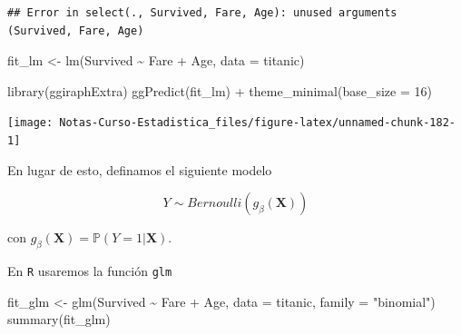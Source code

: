 \documentclass[
  12pt,
]{book}
\newenvironment{Shaded}{\begin{snugshade}}{\end{snugshade}}
\newcommand{\AttributeTok}[1]{\textcolor[rgb]{0.77,0.63,0.00}{#1}}
\newcommand{\DecValTok}[1]{\textcolor[rgb]{0.00,0.00,0.81}{#1}}
\newcommand{\FunctionTok}[1]{\textcolor[rgb]{0.00,0.00,0.00}{#1}}
\newcommand{\NormalTok}[1]{#1}
\newcommand{\OtherTok}[1]{\textcolor[rgb]{0.56,0.35,0.01}{#1}}
\newcommand{\SpecialCharTok}[1]{\textcolor[rgb]{0.00,0.00,0.00}{#1}}
\newcommand{\StringTok}[1]{\textcolor[rgb]{0.31,0.60,0.02}{#1}}
\begin{document}
\begin{verbatim}
## Error in select(., Survived, Fare, Age): unused arguments (Survived, Fare, Age)
\end{verbatim}

\begin{Shaded}
\begin{Highlighting}[]
\NormalTok{fit\_lm }\OtherTok{\textless{}{-}} \FunctionTok{lm}\NormalTok{(Survived }\SpecialCharTok{\textasciitilde{}}\NormalTok{ Fare }\SpecialCharTok{+}\NormalTok{ Age, }\AttributeTok{data =}\NormalTok{ titanic)}
\end{Highlighting}
\end{Shaded}

\begin{Shaded}
\begin{Highlighting}[]
\FunctionTok{library}\NormalTok{(ggiraphExtra)}
\FunctionTok{ggPredict}\NormalTok{(fit\_lm) }\SpecialCharTok{+} \FunctionTok{theme\_minimal}\NormalTok{(}\AttributeTok{base\_size =} \DecValTok{16}\NormalTok{)}
\end{Highlighting}
\end{Shaded}

\begin{center}\texttt{[image: Notas-Curso-Estadistica\_files/figure-latex/unnamed-chunk-182-1]} \end{center}

En lugar de esto, definamos el siguiente modelo

\begin{equation*}
Y \sim Bernoulli (g_{\beta}(\boldsymbol{X})) 
\end{equation*}

con
\(g_{\beta}(\boldsymbol{X}) = \mathbb{P}\left(Y=1 \vert \boldsymbol{X}\right)\).

En \texttt{R} usaremos la función \texttt{glm}

\begin{Shaded}
\begin{Highlighting}[]
\NormalTok{fit\_glm }\OtherTok{\textless{}{-}} \FunctionTok{glm}\NormalTok{(Survived }\SpecialCharTok{\textasciitilde{}}\NormalTok{ Fare }\SpecialCharTok{+}\NormalTok{ Age, }\AttributeTok{data =}\NormalTok{ titanic,}
    \AttributeTok{family =} \StringTok{"binomial"}\NormalTok{)}
\FunctionTok{summary}\NormalTok{(fit\_glm)}
\end{Highlighting}
\end{Shaded}
\end{document}
